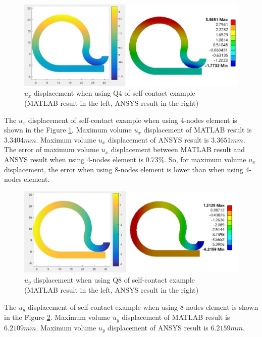 \begin{figure}[H]
    \centering
    \includegraphics[scale=0.65]{Figures/chapter5/s_q4_ux.jpg}
    \decoRule
    \caption{$u_x$ displacement when using Q4 of self-contact example \\
    (MATLAB result in the left, ANSYS result in the right)}
    \label{fig:s_q4_ux}
\end{figure}
\noindent
The $u_x$ displacement of self-contact example when using 4-nodes element is shown in the Figure \ref{fig:s_q4_ux}.
Maximum volume $u_x$ displacement of MATLAB result is $3.3404 mm$.
Maximum volume $u_x$ displacement of ANSYS result is $3.3651 mm$.
The error of maximum volume $u_x$ displacement between MATLAB result and ANSYS result when using 4-nodes element is $0.73\%$.
So, for maximum volume $u_x$ displacement, the error when using 8-nodes element is lower than when using 4-nodes element.
\newpage
\begin{figure}[H]
    \centering
    \includegraphics[scale=0.7]{Figures/chapter5/s_q8_uy.jpg}
    \decoRule
    \caption{$u_y$ displacement when using Q8 of self-contact example \\
    (MATLAB result in the left, ANSYS result in the right)}
    \label{fig:s_q8_uy}
\end{figure}
\noindent
The $u_y$ displacement of self-contact example when using 8-nodes element is shown in the Figure \ref{fig:s_q8_uy}.
Maximum volume $u_y$ displacement of MATLAB result is $6.2109mm$.
Maximum volume $u_y$ displacement of ANSYS result is $6.2159mm$.
